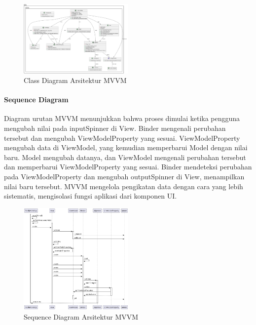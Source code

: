 \documentclass[conference]{IEEEtran}
\begin{document}
	\begin{figure}[h]
		\centering
		\includegraphics[width=0.5\textwidth]{../uml/mvvm_class.png}
		\caption{Class Diagram Arsitektur MVVM}
		\label{fig:class_mvvm}
	\end{figure}
	
	\paragraph{Sequence Diagram}
	Diagram urutan MVVM menunjukkan bahwa proses dimulai ketika pengguna mengubah nilai pada inputSpinner di View. Binder mengenali perubahan tersebut dan mengubah ViewModelProperty yang sesuai. ViewModelProperty mengubah data di ViewModel, yang kemudian memperbarui Model dengan nilai baru. Model mengubah datanya, dan ViewModel mengenali perubahan tersebut dan memperbarui ViewModelProperty yang sesuai. Binder mendeteksi perubahan pada ViewModelProperty dan mengubah outputSpinner di View, menampilkan nilai baru tersebut. MVVM mengelola pengikatan data dengan cara yang lebih sistematis, mengisolasi fungsi aplikasi dari komponen UI.
	
	\vspace{5 cm} 
	
	\begin{figure}[h]
		\centering
		\includegraphics[width=0.5\textwidth]{../uml/mvvm_sequence.png}
		\caption{Sequence Diagram Arsitektur MVVM}
		\label{fig:sequence_mvvm}
	\end{figure}
	
\end{document}
